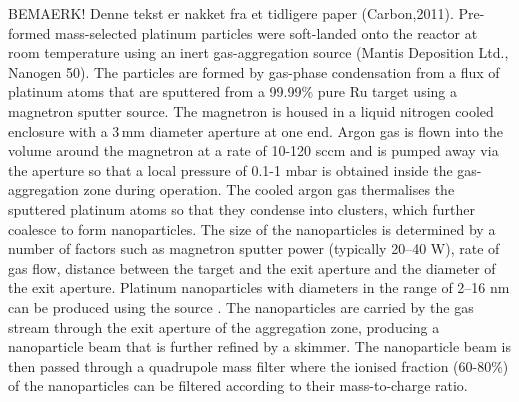 \documentclass[8.5pt,twoside,twocolumn]{article}
\begin{document}
BEMAERK! Denne tekst er nakket fra et tidligere paper (Carbon,2011). Pre-formed mass-selected platinum particles were soft-landed onto the reactor at room temperature using an inert gas-aggregation source (Mantis Deposition Ltd., Nanogen 50).
The particles are formed by gas-phase condensation from a flux of platinum atoms that are sputtered from a 99.99\% pure Ru target using a magnetron sputter source. The magnetron is housed in a liquid nitrogen cooled enclosure with a 3\,mm diameter aperture at one end. Argon gas is flown into the volume around the magnetron at a rate of 10-120 sccm and is pumped away via the aperture so that a local pressure of 0.1-1 mbar  is obtained inside the gas-aggregation zone during operation. The cooled argon gas thermalises the sputtered platinum atoms so that they condense into clusters, which further coalesce to form nanoparticles. The size of the nanoparticles is determined by a number of factors such as magnetron sputter power (typically 20–40 W), rate of gas flow, distance between the target and the exit aperture and the diameter of the exit aperture. Platinum nanoparticles with diameters in the range of 2–16 nm can be produced using the source \cite{Nielsen2010,Nielsen2009}. The nanoparticles are carried by the gas stream through the exit aperture of the aggregation zone, producing a nanoparticle beam that is further refined by a skimmer. The nanoparticle beam is then passed through a quadrupole mass filter where the ionised fraction (60-80\%) of the nanoparticles can be filtered according to their mass-to-charge ratio.
\end{document}
